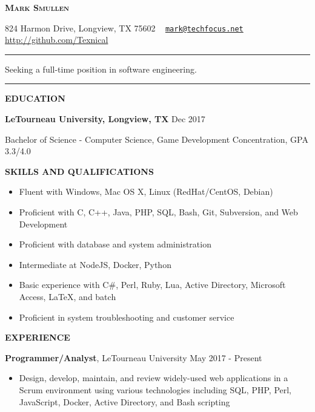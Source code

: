 \documentclass[letterpaper]{article}
\newcommand{\titlename}[1]{\centerline{\huge \bfseries{\scshape{#1}}}}
\newcommand{\contactinfo}[1]{\centerline{\small #1}}
\renewcommand{\section}[1]{\bigskip\noindent\textbf{#1}\smallskip}
\newcommand{\entry}[3]{\textbf{#1}, #2\begin{itemize}[leftmargin=3.5em]#3\end{itemize}\bigskip}
\begin{document}
\titlename{Mark Smullen}
\contactinfo{%
    824 Harmon Drive, Longview, TX 75602 \textperiodcentered \ %
    \href{mailto:mark@techfocus.net}{\nolinkurl{mark@techfocus.net}} \textperiodcentered \ %
    \url{http://github.com/Texnical} \textperiodcentered \ %
    \phonenumber[country=US]{2707911770}%
}
\vspace{2mm}
\hrule
\vspace{2mm}
\centerline{Seeking a full-time position in software engineering.}
\vspace{2mm}
\hrule

\section{EDUCATION}

\textbf{LeTourneau University, Longview, TX}                            \hfill          Dec 2017

Bachelor of Science - Computer Science, Game Development Concentration, GPA 3.3/4.0


\section{SKILLS AND QUALIFICATIONS}

\begin{multicols}{2}
\begin{itemize}[leftmargin=3.5em]
    \item Fluent with Windows, Mac OS X, Linux (RedHat/CentOS, Debian)
    \item Proficient with C, C++, Java, PHP, SQL, Bash, Git, Subversion, and Web Development
    \item Proficient with database and system administration
    \item Intermediate at NodeJS, Docker, Python
    \item Basic experience with C\#, Perl, Ruby, Lua, Active Directory, Microsoft Access, \LaTeX{}, and batch
    \item Proficient in system troubleshooting and customer service
\end{itemize}
\end{multicols}

\section{EXPERIENCE}

\entry{Programmer/Analyst}{LeTourneau University                 \hfill          May 2017 - Present} {
    \item Design, develop, maintain, and review widely-used web applications in a Scrum environment using various technologies including SQL, PHP, Perl, JavaScript, Docker, Active Directory, and Bash scripting
}
\end{document}
